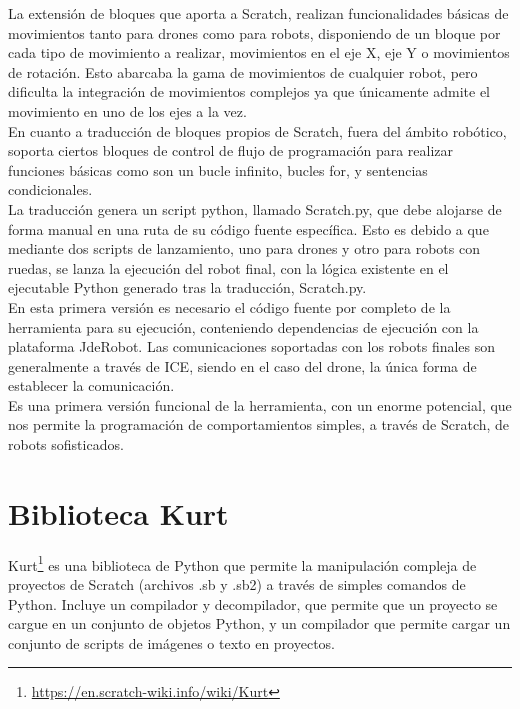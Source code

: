 La extensión de bloques que aporta a Scratch, realizan funcionalidades básicas de movimientos tanto para drones como para robots, disponiendo de un bloque por cada tipo de movimiento a realizar, movimientos en el eje X, eje Y o movimientos de rotación. Esto abarcaba la gama de movimientos de cualquier robot, pero dificulta la integración de movimientos complejos ya que únicamente admite el movimiento en uno de los ejes a la vez.\\

En cuanto a traducción de bloques propios de Scratch, fuera del ámbito robótico, soporta ciertos bloques de control de flujo de programación para realizar funciones básicas como son un bucle infinito, bucles for, y sentencias condicionales.\\

La traducción genera un script python, llamado Scratch.py, que debe alojarse de forma manual en una ruta de su código fuente específica. Esto es debido a que mediante dos scripts de lanzamiento, uno para drones y otro para robots con ruedas, se lanza la ejecución del robot final, con la lógica existente en el ejecutable Python generado tras la traducción, Scratch.py.\\

En esta primera versión es necesario el código fuente por completo de la herramienta para su ejecución, conteniendo dependencias de ejecución con la plataforma JdeRobot. Las comunicaciones soportadas con los robots finales son generalmente a través de ICE, siendo en el caso del drone, la única forma de establecer la comunicación.\\

Es una primera versión funcional de la  herramienta, con un enorme potencial, que nos permite la programación de comportamientos simples, a través de Scratch, de robots sofisticados.

\section{Biblioteca Kurt}
\label{sec:kurt}
Kurt\footnote{\url{https://en.scratch-wiki.info/wiki/Kurt}} es una biblioteca de Python que permite la manipulación compleja de proyectos de Scratch (archivos .sb y .sb2) a través de simples comandos de Python. Incluye un compilador y decompilador, que permite que un proyecto se cargue en un conjunto de objetos Python, y un compilador que permite cargar un conjunto de scripts de imágenes o texto en proyectos.\\

